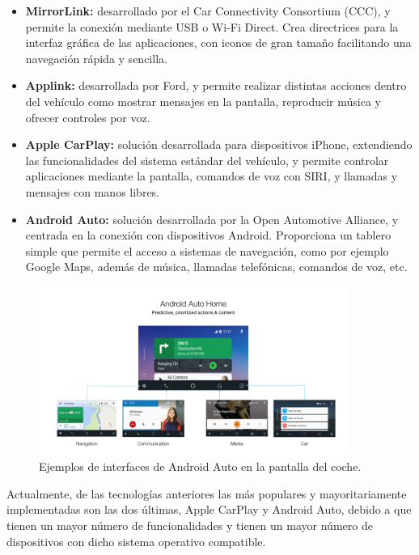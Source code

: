 \documentclass[12pt]{report} %
\begin{document}
\begin{itemize}

    \item \textbf{MirrorLink:} desarrollado por el Car Connectivity Consortium (CCC), y permite la conexión mediante USB o Wi-Fi Direct. Crea directrices para la interfaz gráfica de las aplicaciones, con iconos de gran tamaño facilitando una navegación rápida y sencilla.
    \item \textbf{Applink:} desarrollada por Ford, y permite realizar distintas acciones dentro del vehículo como mostrar mensajes en la pantalla, reproducir música y ofrecer controles por voz.
    \item \textbf{Apple CarPlay:} solución desarrollada para dispositivos iPhone, extendiendo las funcionalidades del sistema estándar del vehículo, y permite controlar aplicaciones mediante la pantalla, comandos de voz con SIRI, y llamadas y mensajes con manos libres.
    \item \textbf{Android Auto:} solución desarrollada por la Open Automotive Alliance, y centrada en la conexión con dispositivos Android. Proporciona un tablero simple que permite el acceso a sistemas de navegación, como por ejemplo Google Maps, además de música, llamadas telefónicas, comandos de voz, etc.

\end{itemize}

\begin{figure}[h]
	\centering
	\includegraphics[width=0.9\textwidth]{androidAuto.png}
	\caption{Ejemplos de interfaces de Android Auto en la pantalla del coche.}
	\label{fig:imagen5}
\end{figure}

Actualmente, de las tecnologías anteriores las más populares y mayoritariamente implementadas  son las dos últimas,  Apple CarPlay y Android Auto, debido a que tienen un mayor número de funcionalidades y tienen un mayor número de dispositivos con dicho sistema operativo compatible.
\end{document}
